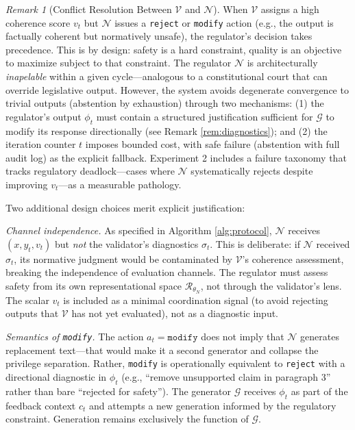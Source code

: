 \documentclass[11pt,a4paper]{article}
\theoremstyle{remark}
\newtheorem{remark}{Remark}[section]
\begin{document}
\begin{remark}[Conflict Resolution Between $\mathcal{V}$ and $\mathcal{N}$]
\label{rem:conflict}
When $\mathcal{V}$ assigns a high coherence score $v_t$ but $\mathcal{N}$ issues a \texttt{reject} or \texttt{modify} action (e.g., the output is factually coherent but normatively unsafe), the regulator's decision takes precedence. This is by design: safety is a hard constraint, quality is an objective to maximize subject to that constraint. The regulator $\mathcal{N}$ is architecturally \emph{inapelable} within a given cycle---analogous to a constitutional court that can override legislative output. However, the system avoids degenerate convergence to trivial outputs (abstention by exhaustion) through two mechanisms: (1) the regulator's output $\phi_t$ must contain a structured justification sufficient for $\mathcal{G}$ to modify its response directionally (see Remark \ref{rem:diagnostics}); and (2) the iteration counter $t$ imposes bounded cost, with safe failure (abstention with full audit log) as the explicit fallback. Experiment 2 includes a failure taxonomy that tracks regulatory deadlock---cases where $\mathcal{N}$ systematically rejects despite improving $v_t$---as a measurable pathology.

Two additional design choices merit explicit justification:

\emph{Channel independence.} As specified in Algorithm \ref{alg:protocol}, $\mathcal{N}$ receives $(x, y_t, v_t)$ but \emph{not} the validator's diagnostics $\sigma_t$. This is deliberate: if $\mathcal{N}$ received $\sigma_t$, its normative judgment would be contaminated by $\mathcal{V}$'s coherence assessment, breaking the independence of evaluation channels. The regulator must assess safety from its own representational space $\mathcal{R}_{\theta_N}$, not through the validator's lens. The scalar $v_t$ is included as a minimal coordination signal (to avoid rejecting outputs that $\mathcal{V}$ has not yet evaluated), not as a diagnostic input.

\emph{Semantics of \texttt{modify}.} The action $a_t = \texttt{modify}$ does not imply that $\mathcal{N}$ generates replacement text---that would make it a second generator and collapse the privilege separation. Rather, \texttt{modify} is operationally equivalent to \texttt{reject} with a directional diagnostic in $\phi_t$ (e.g., ``remove unsupported claim in paragraph 3'' rather than bare ``rejected for safety''). The generator $\mathcal{G}$ receives $\phi_t$ as part of the feedback context $c_t$ and attempts a new generation informed by the regulatory constraint. Generation remains exclusively the function of $\mathcal{G}$.
\end{remark}
\end{document}
